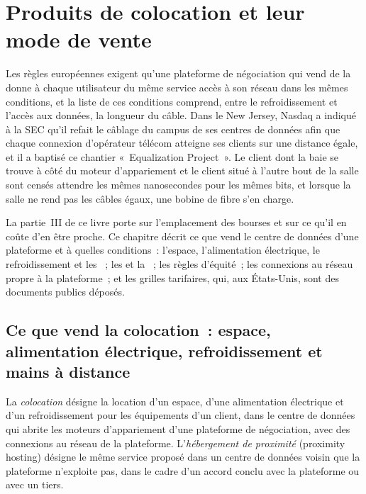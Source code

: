 \chapter{Produits de colocation et leur mode de vente}\label{ch:nw:colocation-products-and-how-they-are-sold}

Les règles européennes exigent qu'une plateforme de négociation qui vend de la  donne à chaque utilisateur du même service accès à son réseau dans les
mêmes conditions, et la liste de ces conditions comprend, entre le refroidissement et l'accès aux données, la longueur du câble. Dans le New
Jersey, Nasdaq a indiqué à la SEC qu'il refait le câblage du campus de ses centres de données afin que chaque connexion d'opérateur télécom
atteigne ses clients sur une distance égale, et il a baptisé ce chantier «~Equalization Project~». Le client dont la baie
se trouve à côté du moteur d'appariement et le client situé à l'autre bout de la salle sont censés attendre les mêmes nanosecondes pour les mêmes
bits, et lorsque la salle ne rend pas les câbles égaux, une bobine de fibre s'en charge.

La partie~III de ce livre porte sur l'emplacement des bourses et sur ce qu'il en coûte d'en être proche. Ce chapitre décrit ce que vend le centre de données d'une plateforme
et à quelles conditions~: l'espace, l'alimentation électrique, le refroidissement et les ~; les  et la ~; les règles d'équité~; les
connexions au réseau propre à la plateforme~; et les grilles tarifaires, qui, aux États-Unis, sont des documents publics déposés.

\section{Ce que vend la colocation~: espace, alimentation électrique, refroidissement et mains à distance}

\begin{definition}\label{def:nw:colocation-products-and-how-they-are-sold:colo}
La \emph{colocation} désigne la location d'un espace, d'une alimentation électrique et d'un refroidissement pour les équipements d'un client, dans le centre de données qui abrite les
moteurs d'appariement d'une plateforme de négociation, avec des connexions au réseau de la plateforme. L'\emph{hébergement de proximité} (proximity hosting) désigne le même service proposé dans un
centre de données voisin que la plateforme n'exploite pas, dans le cadre d'un accord conclu avec la plateforme ou avec un tiers.
\end{definition}

